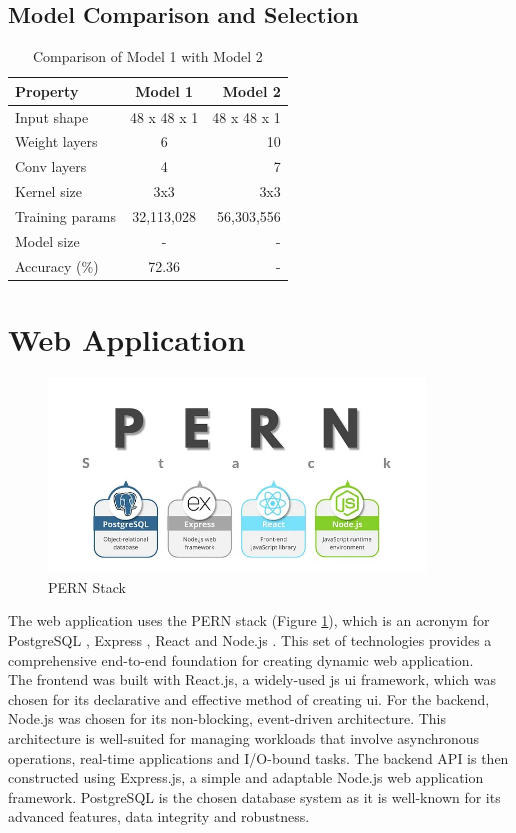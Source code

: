 \subsection{Model Comparison and Selection}
\begin{table}[ht]
    \centering
    \renewcommand{\arraystretch}{1.5}
    \begin{tabular*}{\textwidth}{@{\extracolsep{\fill}}lcr}
    \toprule
    \textbf{Property} & \textbf{Model 1} & \textbf{Model 2} \\
    \midrule
    Input shape & 48 x 48 x 1 & 48 x 48 x 1 \\
    Weight layers & 6 & 10 \\
    Conv layers & 4 & 7 \\
    Kernel size & 3x3 & 3x3 \\
    Training params & 32,113,028 & 56,303,556 \\
    Model size & - & - \\
    Accuracy (\%) & 72.36 & - \\
    \bottomrule
    \end{tabular*}
    \caption{Comparison of Model 1 with Model 2}
    \label{tab:comparison-models}
\end{table}
\section{Web Application}
\begin{figure}[h!]
    \centering
    \includegraphics[width=10cm]{Images/pern.png}
    \caption{PERN Stack \citep{alves_2023_get}}
    \label{fig:pern}
\end{figure}
The web application uses the PERN stack (Figure \ref{fig:pern}), which is an acronym for PostgreSQL \citep{thepostgresqlglobaldevelopmentgroup_2019_postgresql}, Express \citep{openjsfoundation_2017_express}, React \citep{metaopensource_2024_react} and Node.js \citep{nodejs_2023_nodejs}.
This set of technologies provides a comprehensive end-to-end foundation for creating dynamic web application.
\\
\indent The frontend was built with React.js, a widely-used \gls{js} \gls{ui} framework, which was chosen for its declarative and effective method of creating \gls{ui}.
For the backend, Node.js was chosen for its non-blocking, event-driven architecture.
This architecture is well-suited for managing workloads that involve asynchronous operations, real-time applications and I/O-bound tasks.
The backend API is then constructed using Express.js, a simple and adaptable Node.js web application framework.
PostgreSQL is the chosen database system as it is well-known for its advanced features, data integrity and robustness.